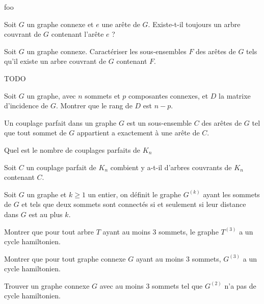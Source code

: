 \documentclass[french]{report}
\begin{document}
\begin{exo}
    foo
    \begin{q}{1}
        Soit \(G\) un graphe connexe et \(e\) une arête de \(G\). Existe-t-il toujours
        un arbre couvrant de \(G\) contenant l'arête \(e\) ?
    \end{q}
    \begin{q}{2}
        Soit \(G\) un graphe connexe. Caractériser les sous-ensembles \(F\) des arêtes
        de \(G\) tels qu'il existe un arbre couvrant de \(G\) contenant \(F\).
    \end{q}
\end{exo}

\begin{exo}
    TODO
\end{exo}

\begin{exo}
    Soit \(G\) un graphe, avec \(n\) sommets et \(p\) composantes connexes, et \(D\)
    la matrixe d'incidence de \(G\). Montrer que le rang de \(D\) est \(n-p\).
\end{exo}

\begin{exo}
    Un couplage parfait dans un graphe \(G\) est un sous-ensemble \(C\) des arêtes
    de \(G\) tel que tout sommet de \(G\) appartient a exactement à une arête de \(C\).
    \begin{q}{1}
        Quel est le nombre de couplages parfaits de \(K_n\)
    \end{q}
    \begin{q}{2}
        Soit \(C\) un couplage parfait de \(K_n\) combient y a-t-il d'arbres couvrants
        de \(K_n\) contenant \(C\).
    \end{q}
\end{exo}

\begin{exo}
    Soit \(G\) un graphe et \(k\geq 1\) un entier, on définit le graphe \(G^{(k)}\)
    ayant les sommets de \(G\) et tels que deux sommets sont connectés si et seulement
    si leur distance dans \(G\) est au plus \(k\).
    \begin{q}{1}
        Montrer que pour tout arbre \(T\) ayant au moins \(3\) sommets, le
        graphe \(T^{(3)}\) a un cycle hamiltonien.
    \end{q}
    \begin{q}{2}
        Montrer que pour tout graphe connexe \(G\) ayant au moins \(3\) sommets,
        \(G^{(3)}\) a un cycle hamiltonien.
    \end{q}
    \begin{q}{3}
        Trouver un graphe connexe \(G\) avec au moins \(3\) sommets tel que
        \(G^{(2)}\) n'a pas de cycle hamiltonien.
    \end{q}
\end{exo}
\end{document}

